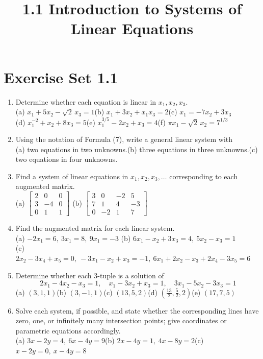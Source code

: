 \documentclass{article}
\title{1.1 Introduction to Systems of Linear Equations}
\date{}
\author{}
\theoremstyle{mystyle}
\begin{document}
\section*{Exercise Set 1.1}
\begin{enumerate}
    \item[1.] Determine whether each equation is linear in $x_1, x_2, x_3$.\\
    (a) $x_1+5x_2-\sqrt2\,x_3=1$\quad (b) $x_1+3x_2+x_1x_3=2$\quad (c) $x_1=-7x_2+3x_3$\\
    (d) $x_1^{-2}+x_2+8x_3=5$\quad (e) $x_1^{3/5}-2x_2+x_3=4$\quad (f) $\pi x_1-\sqrt2\,x_2=7^{1/3}$

    \item[3.] Using the notation of Formula (7), write a general linear system with\\
    (a) two equations in two unknowns.\quad (b) three equations in three unknowns.\quad (c) two equations in four unknowns.

    \item[5.] Find a system of linear equations in $x_1,x_2,x_3,\dots$ corresponding to each augmented matrix.\\
    (a) $\begin{bmatrix}2&0&0\\3&-4&0\\0&1&1\end{bmatrix}$\qquad
    (b) $\begin{bmatrix}3&0&-2&5\\7&1&4&-3\\0&-2&1&7\end{bmatrix}$

    \item[7.] Find the augmented matrix for each linear system.\\
    (a) $-2x_1=6,\ 3x_1=8,\ 9x_1=-3$\qquad
    (b) $6x_1-x_2+3x_3=4,\ 5x_2-x_3=1$\\
    (c) $2x_2-3x_4+x_5=0,\ -3x_1-x_2+x_3=-1,\ 6x_1+2x_2-x_3+2x_4-3x_5=6$

    \item[9.] Determine whether each 3-tuple is a solution of
    \[
    2x_1-4x_2-x_3=1,\quad x_1-3x_2+x_3=1,\quad 3x_1-5x_2-3x_3=1
    \]
    (a) $(3,1,1)$\quad (b) $(3,-1,1)$\quad (c) $(13,5,2)$\quad (d) $\left(\tfrac{13}2,\tfrac52,2\right)$\quad (e) $(17,7,5)$

    \item[11.] Solve each system, if possible, and state whether the corresponding lines have zero, one, or infinitely many intersection points; give coordinates or parametric equations accordingly.\\
    (a) $3x-2y=4,\ 6x-4y=9$\qquad (b) $2x-4y=1,\ 4x-8y=2$\qquad (c) $x-2y=0,\ x-4y=8$


\end{enumerate}
\end{document}

